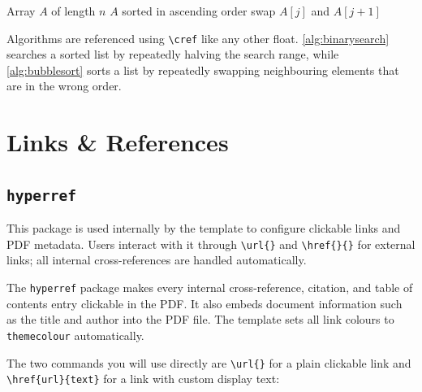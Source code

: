 	\begin{algorithm}[H]
		\caption{Bubble Sort}
		\label{alg:bubblesort}
		\begin{algorithmic}[1]
			\Require Array $A$ of length $n$
			\Ensure $A$ sorted in ascending order
			\State swap $A[j]$ and $A[j+1]$ 
			\EndIf
			\EndFor
			\EndFor
			\EndFunction
		\end{algorithmic}
	\end{algorithm}
	
	Algorithms are referenced using \texttt{\textbackslash cref} like any other float. \cref{alg:binarysearch} searches a sorted list by repeatedly halving the search range, while \cref{alg:bubblesort} sorts a list by repeatedly swapping neighbouring elements that are in the wrong order.

\section{Links \& References}

	\subsection{\texttt{hyperref}}
	\noindent\colorbox{themecolour!15}{\parbox{\linewidth}{\small This package is used internally by the template to configure clickable links and PDF metadata. Users interact with it through \texttt{\textbackslash url\{\}} and \texttt{\textbackslash href\{\}\{\}} for external links; all internal cross-references are handled automatically.}}\vspace{0.5\baselineskip}
	
	The \texttt{hyperref} package makes every internal cross-reference, citation, and table of contents entry clickable in the PDF. It also embeds document information such as the title and author into the PDF file. The template sets all link colours to \texttt{themecolour} automatically.
	
	The two commands you will use directly are \texttt{\textbackslash url\{\}} for a plain clickable link and \texttt{\textbackslash href\{url\}\{text\}} for a link with custom display text:
	
